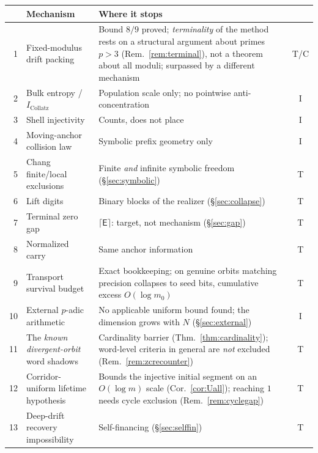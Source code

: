 \documentclass[11pt]{article}
\theoremstyle{plain}
\theoremstyle{definition}
\theoremstyle{remark}
\newcommand{\Edep}{\mathsf{E}}          %
\begin{document}
\begin{center}
\scriptsize
\begin{tabular}{@{}rp{}p{}c@{}}
\toprule
& Mechanism & Where it stops & \\
\midrule
1 & Fixed-modulus drift packing & Bound $8/9$ proved; \emph{terminality} of the method rests on a
structural argument about primes $p>3$ (Rem.~\ref{rem:terminal}), not a theorem about all moduli;
surpassed by a different
mechanism & \textsf{T}/\textsf{C} \\
2 & Bulk entropy / $I_{\mathrm{Collatz}}$ & Population scale only; no pointwise
anti-concentration & \textsf{I} \\
3 & Shell injectivity & Counts, does not place & \textsf{I} \\
4 & Moving-anchor collision law & Symbolic prefix geometry only & \textsf{I} \\
5 & Chang finite/local exclusions & Finite \emph{and} infinite symbolic freedom
(\S\ref{sec:symbolic}) & \textsf{T} \\
6 & Lift digits & Binary blocks of the realizer (\S\ref{sec:collapse}) & \textsf{T} \\
7 & Terminal zero gap & $\lceil\Edep\rceil$: target, not mechanism (\S\ref{sec:gap}) & \textsf{T} \\
8 & Normalized carry & Same anchor information & \textsf{T} \\
9 & Transport survival budget & Exact bookkeeping; on genuine orbits matching precision collapses
to seed bits, cumulative excess $O(\log m_0)$ & \textsf{T} \\
10 & External $p$-adic arithmetic & No applicable uniform bound found; the dimension grows with
$N$ (\S\ref{sec:external}) & \textsf{I} \\
11 & The \emph{known divergent-orbit} word shadows & Cardinality barrier
(Thm.~\ref{thm:cardinality}); word-level criteria in general are \emph{not} excluded
(Rem.~\ref{rem:zcrecounter}) & \textsf{T} \\
12 & Corridor-uniform lifetime hypothesis & Bounds the injective initial segment on an
$O(\log m)$ scale (Cor.~\ref{cor:Uall}); reaching $1$ needs cycle exclusion
(Rem.~\ref{rem:cyclegap}) & \textsf{T} \\
13 & Deep-drift recovery impossibility & Self-financing (\S\ref{sec:selffin}) & \textsf{T} \\
\bottomrule
\end{tabular}
\end{center}
\end{document}
